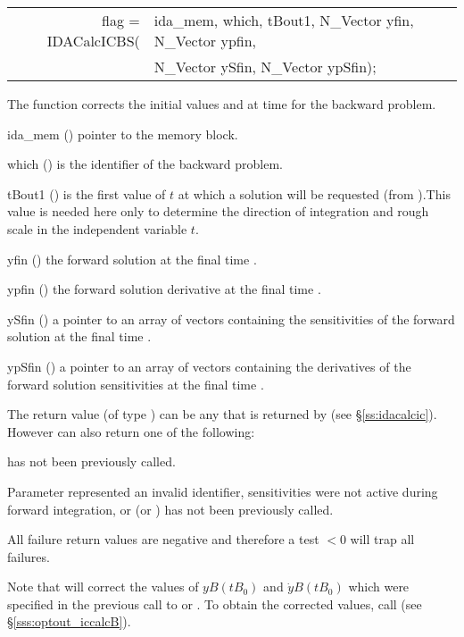 {
  \begin{tabular}[t]{@{}r@{}l@{}}
  flag = IDACalcICBS(&ida\_mem, which, tBout1, N\_Vector yfin, N\_Vector ypfin, \\
                     &N\_Vector ySfin, N\_Vector ypSfin);
  \end{tabular}
}
{
  The function  corrects the initial values  and  at
  time  for the backward problem.
}
{
  \begin{args}
  \item[ida\_mem] ()
    pointer to the {\idas} memory block.
  \item[which] ()
    is the identifier of the backward problem.
  \item[tBout1] ()
    is the first value of $t$ at which a solution will be requested (from
    ).This value is needed here only to determine the direction of
    integration and rough scale in the independent variable $t$.
  \item[yfin] ()
    the forward solution at the final time .
  \item[ypfin] ()
    the forward solution derivative at the final time .
  \item[ySfin]  ()
    a pointer to an array of  vectors containing the sensitivities of
    the forward solution at the final time .
  \item[ypSfin]  ()
    a pointer to an array of  vectors containing the derivatives of
    the forward solution sensitivities at the final time .

  \end{args}
}
{
  The return value  (of type ) can be any that is returned by
   (see \S\ref{ss:idacalcic}). However  can also
  return one of the following:

  \begin{args}
  \item[\Id{IDA\_NO\_ADJ}]
     has not been previously called.
  \item[\id{IDA\_ILL\_INPUT}]
    Parameter  represented an invalid identifier, sensitivities were
    not active during forward integration, or  (or )
    has not been previously called.
  \end{args}
}
{
  All failure return values are negative and therefore a test  $< 0$
  will trap all  failures.

  Note that  will correct the values of $yB(tB_0)$ and
  $\dot{y}B(tB_0)$ which were specified in the previous call to 
  or . To obtain the corrected values, call
   (see \S\ref{sss:optout_iccalcB}).
}



